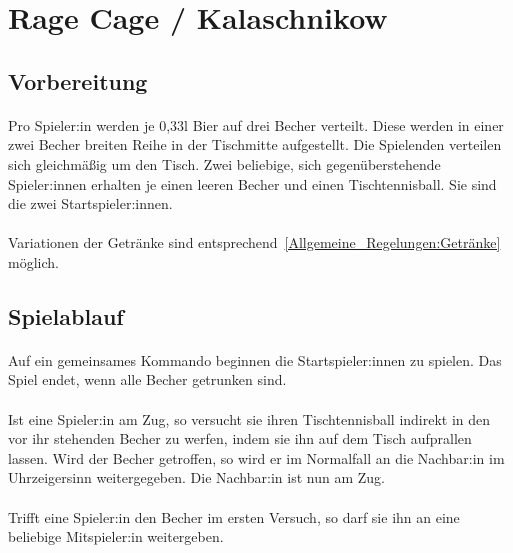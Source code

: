 \section{Rage Cage / Kalaschnikow}
\subsection{Vorbereitung}
\paragraph{}
Pro Spieler:in werden je 0,33l Bier auf drei Becher verteilt.
Diese werden in einer zwei Becher breiten Reihe in der Tischmitte aufgestellt.
Die Spielenden verteilen sich gleichmäßig um den Tisch.
Zwei beliebige, sich gegenüberstehende Spieler:innen erhalten je einen leeren Becher und einen Tischtennisball.
Sie sind die zwei Startspieler:innen.

\paragraph{}
Variationen der Getränke sind entsprechend~\ref{Allgemeine_Regelungen:Getränke} möglich.

\subsection{Spielablauf}
\paragraph{}
Auf ein gemeinsames Kommando beginnen die Startspieler:innen zu spielen.
Das Spiel endet, wenn alle Becher getrunken sind.

\paragraph{}
Ist eine Spieler:in am Zug, so versucht sie ihren Tischtennisball indirekt in den vor ihr stehenden Becher zu werfen, indem sie ihn auf dem Tisch aufprallen lassen.
Wird der Becher getroffen, so wird er im Normalfall an die Nachbar:in im Uhrzeigersinn weitergegeben.
Die Nachbar:in ist nun am Zug.

\paragraph{}
Trifft eine Spieler:in den Becher im ersten Versuch, so darf sie ihn an eine beliebige Mitspieler:in weitergeben.

